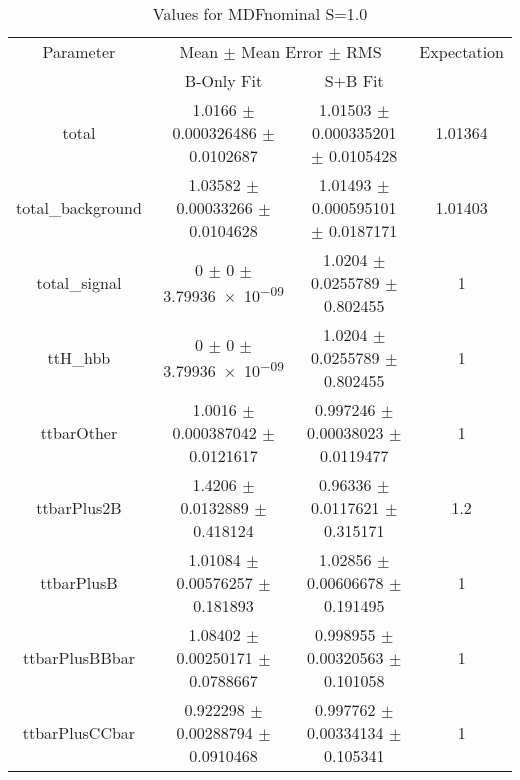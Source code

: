 \begin{table}
\centering
\caption{Values for MDFnominal S=1.0}
\begin{tabular}{cccc}
\toprule
Parameter & \multicolumn{2}{c}{Mean $\pm$ Mean Error $\pm$ RMS} & Expectation\\
 & B-Only Fit & S+B Fit & \\
\midrule
total & \num{1.0166} $\pm$ \num{0.000326486} $\pm$ \num{0.0102687} & \num{1.01503} $\pm$ \num{0.000335201} $\pm$ \num{0.0105428} & \num{1.01364}\\
total\_background & \num{1.03582} $\pm$ \num{0.00033266} $\pm$ \num{0.0104628} & \num{1.01493} $\pm$ \num{0.000595101} $\pm$ \num{0.0187171} & \num{1.01403}\\
total\_signal & \num{0} $\pm$ \num{0} $\pm$ \num{3.79936e-09} & \num{1.0204} $\pm$ \num{0.0255789} $\pm$ \num{0.802455} & \num{1}\\
ttH\_hbb & \num{0} $\pm$ \num{0} $\pm$ \num{3.79936e-09} & \num{1.0204} $\pm$ \num{0.0255789} $\pm$ \num{0.802455} & \num{1}\\
ttbarOther & \num{1.0016} $\pm$ \num{0.000387042} $\pm$ \num{0.0121617} & \num{0.997246} $\pm$ \num{0.00038023} $\pm$ \num{0.0119477} & \num{1}\\
ttbarPlus2B & \num{1.4206} $\pm$ \num{0.0132889} $\pm$ \num{0.418124} & \num{0.96336} $\pm$ \num{0.0117621} $\pm$ \num{0.315171} & \num{1.2}\\
ttbarPlusB & \num{1.01084} $\pm$ \num{0.00576257} $\pm$ \num{0.181893} & \num{1.02856} $\pm$ \num{0.00606678} $\pm$ \num{0.191495} & \num{1}\\
ttbarPlusBBbar & \num{1.08402} $\pm$ \num{0.00250171} $\pm$ \num{0.0788667} & \num{0.998955} $\pm$ \num{0.00320563} $\pm$ \num{0.101058} & \num{1}\\
ttbarPlusCCbar & \num{0.922298} $\pm$ \num{0.00288794} $\pm$ \num{0.0910468} & \num{0.997762} $\pm$ \num{0.00334134} $\pm$ \num{0.105341} & \num{1}\\
\bottomrule
\end{tabular}
\end{table}